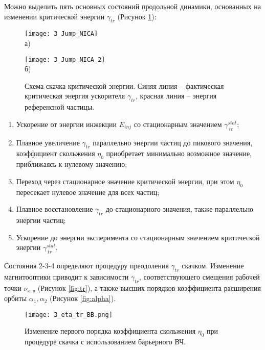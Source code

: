 Можно выделить пять основных состояний продольной динамики, основанных на изменении критической энергии 
$\gamma_{tr}$ (Рисунок \ref{fig:jump_NICA}):

\begin{figure}[!h]
    \begin{minipage}[b][][b]{0.49\linewidth}\centering
        \texttt{[image: 3\_Jump\_NICA]} \\ а)
    \end{minipage}
    \hfill
    \begin{minipage}[b][][b]{0.49\linewidth}\centering
        \texttt{[image: 3\_Jump\_NICA\_2]} \\ б)
    \end{minipage}
    \caption{Схема скачка критической энергии. Синяя линия – фактическая критическая энергия ускорителя $\gamma_{tr}$, красная линия – энергия референсной частицы.}
    \label{fig:jump_NICA}
\end{figure}

\begin{enumerate} 
  \item Ускорение от энергии инжекции $E_{inj}$ со стационарным значением $\gamma_{\ tr}^{stat}$;
  \item  Плавное увеличение $\gamma_{tr}$ параллельно энергии частиц до пикового значения, коэффициент скольжения $\eta_0$ приобретает минимально возможное значение, приближаясь к нулевому значению;
  \item Переход через стационарное значение критической энергии, при этом $\eta_0$ пересекает нулевое значение для всех частиц;
  \item Плавное восстановление $\gamma_{tr}$ до стационарного значения, также па\-рал\-лель\-но энергии частиц;
  \item Ускорение до энергии эксперимента со стационарным значением критической энергии $\gamma_{\ tr}^{stat}$.
\end{enumerate}
 
\noindent Состояния 2-3-4 определяют процедуру преодоления $\gamma_{tr}$ скачком. Из\-ме\-не\-ние магнитооптики приводит к зависимости $\gamma_{tr}$, соответствующего смещения рабочей точки $\nu_{x,y}$ (Рисунок \ref{fig:tr}), а также высших порядков коэффициента расширения орбиты $\alpha_1, \alpha_2$ (Рисунок \ref{fig:alpha}).

\begin{figure}    \label{fig:3_g_tr_BB.png}
\centering
   \texttt{[image: 3\_eta\_tr\_BB.png]}
   \caption{Изменение первого порядка коэффициента скольжения $\eta_0$ при процедуре скачка с использованием барьерного ВЧ.}
\end{figure}

